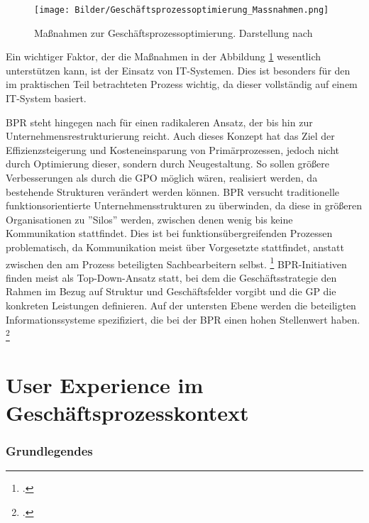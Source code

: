 \begin{figure}[H]
    \centering
    \texttt{[image: Bilder/Geschäftsprozessoptimierung\_Massnahmen.png]}
    \caption[Ma\ss nahmen zur Geschäftsprozessoptimierung]{Ma\ss nahmen zur Geschäftsprozessoptimierung. Darstellung nach \cite[][]{theorie_bleicher_organisation_1991}}
    \label{fig:Geschäftsprozessoptimierung_Massnahmen}
\end{figure}

Ein wichtiger Faktor, der die Ma\ss nahmen in der Abbildung \ref{fig:Geschäftsprozessoptimierung_Massnahmen} wesentlich unterstützen kann, ist der Einsatz von IT-Systemen. Dies ist besonders für den im praktischen Teil betrachteten Prozess wichtig, da dieser vollständig auf einem IT-System basiert.

BPR steht hingegen nach \cite[][]{theorie_hammer_champy_business_reengineering_1996} für einen radikaleren Ansatz, der bis hin zur Unternehmensrestrukturierung reicht. Auch dieses Konzept hat das Ziel der Effizienzsteigerung und Kosteneinsparung von Primärprozessen, jedoch nicht durch Optimierung dieser, sondern durch Neugestaltung. So sollen grö\ss ere Verbesserungen als durch die GPO möglich wären, realisiert werden, da bestehende Strukturen verändert werden können. BPR versucht traditionelle funktionsorientierte Unternehmensstrukturen zu überwinden, da diese in grö\ss eren Organisationen zu ''Silos'' werden, zwischen denen wenig bis keine Kommunikation stattfindet. Dies ist bei funktionsübergreifenden Prozessen problematisch, da Kommunikation meist über Vorgesetzte stattfindet, anstatt zwischen den am Prozess beteiligten Sachbearbeitern selbst. \footcite[Vgl.][S. 12f]{theorie_gadatsch_grundkurs_geschäftsprozessmanagement_2010} BPR-Initiativen finden meist als Top-Down-Ansatz statt, bei dem die Geschäftsstrategie den Rahmen im Bezug auf Struktur und Geschäftsfelder vorgibt und die GP die konkreten Leistungen definieren. Auf der untersten Ebene werden die beteiligten Informationssysteme spezifiziert, die bei der BPR einen hohen Stellenwert haben. \footcite[Vgl.][S. 24]{theorie_osterle_business_1995}

\section{User Experience im Geschäftsprozesskontext}

\subsubsection{Grundlegendes}

